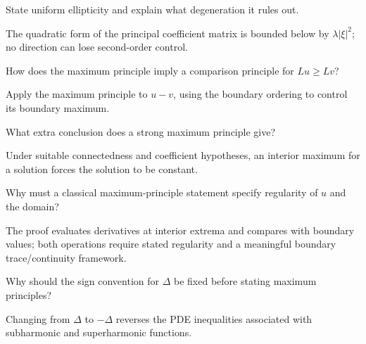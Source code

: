 \begin{problem}\label{prob:iii27-problem-04}
State uniform ellipticity and explain what degeneration it rules out.
\end{problem}
\begin{solution}
The quadratic form of the principal coefficient matrix is bounded below by
\(\lambda|\xi|^2\); no direction can lose second-order control.
\end{solution}

\begin{problem}\label{prob:iii27-problem-05}
How does the maximum principle imply a comparison principle for \(Lu\ge Lv\)?
\end{problem}
\begin{solution}
Apply the maximum principle to \(u-v\), using the boundary ordering to
control its boundary maximum.
\end{solution}

\begin{problem}\label{prob:iii27-problem-06}
What extra conclusion does a strong maximum principle give?
\end{problem}
\begin{solution}
Under suitable connectedness and coefficient hypotheses, an interior
maximum for a solution forces the solution to be constant.
\end{solution}

\begin{problem}\label{prob:iii27-problem-07}
Why must a classical maximum-principle statement specify regularity of \(u\) and the domain?
\end{problem}
\begin{solution}
The proof evaluates derivatives at interior extrema and compares with
boundary values; both operations require stated regularity and a meaningful
boundary trace/continuity framework.
\end{solution}

\begin{problem}\label{prob:iii27-problem-08}
Why should the sign convention for \(\Delta\) be fixed before stating maximum principles?
\end{problem}
\begin{solution}
Changing from \(\Delta\) to \(-\Delta\) reverses the PDE inequalities
associated with subharmonic and superharmonic functions.
\end{solution}

